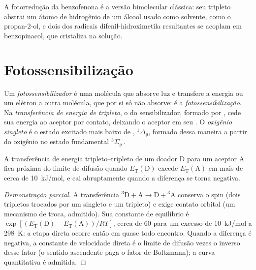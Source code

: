A fotorredução da benzofenona é a versão bimolecular clássica: seu tripleto
abstrai um átomo de hidrogênio de um álcool usado como solvente, como o
propan-2-ol, e dois dos radicais difenil-hidroximetila resultantes se acoplam em
benzopinacol, que cristaliza na solução.

\section{Fotossensibilização}

\begin{definition}\label{def:b3:photochemistry:sensitisation}
Um \emph{fotossensibilizador} é uma molécula que absorve luz
e transfere a energia ou um elétron a outra molécula, que por si só não absorve:
é a \emph{fotossensibilização}. Na
\emph{transferência de energia de tripleto}, o  do sensibilizador, formado por , cede sua energia
ao aceptor por contato, deixando o aceptor em seu . O \emph{oxigênio
singleto} é o estado excitado mais baixo de ,
${}^1\Delta_g$, formado dessa maneira a partir do oxigênio no estado fundamental ${}^3\Sigma_g^-$.
\end{definition}

\begin{proposition}\label{prop:b3:photochemistry:sensitisation-condition}
A transferência de energia tripleto--tripleto de um doador D para um aceptor A fica
próxima do limite de difusão quando $E_{\mathrm T}(\mathrm D)$ excede $E_{\mathrm T}(\mathrm A)$ em mais de cerca de
\qty{10}{kJ/mol}, e cai abruptamente quando a diferença se torna negativa.
\end{proposition}

\begin{proof}[Demonstração parcial]
A transferência ${}^3\mathrm D + \mathrm A \to \mathrm D + {}^3\mathrm A$ conserva o spin (dois tripletos trocados por
um singleto e um tripleto) e exige contato orbital (um mecanismo de troca,
admitido). Sua constante de equilíbrio é $\exp[(E_{\mathrm T}(\mathrm D) - E_{\mathrm T}(\mathrm A))/RT]$, cerca de 60 para
um excesso de \qty{10}{kJ/mol} a \qty{298}{K}: a etapa direta ocorre então em quase todo
encontro. Quando a diferença é negativa, a constante de velocidade direta é o
limite de difusão vezes o inverso desse fator (o sentido ascendente paga o fator
de Boltzmann); a curva quantitativa é admitida.
\end{proof}

